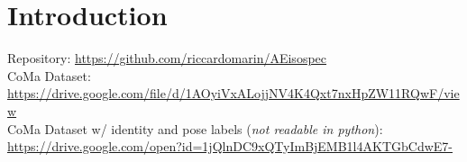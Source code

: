 \section{Introduction}
\label{sec:introduction}
Repository: \url{https://github.com/riccardomarin/AEisospec} \\
CoMa Dataset: \url{https://drive.google.com/file/d/1AOyiVxALojjNV4K4Qxt7nxHpZW11RQwF/view}\\
CoMa Dataset w/ identity and pose labels (\emph{not readable in python}): \url{https://drive.google.com/open?id=1jQlnDC9xQTyImBjEMB1l4AKTGbCdwE7-}
